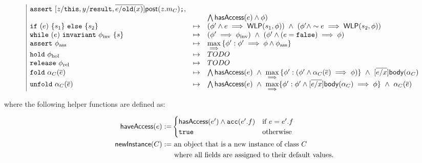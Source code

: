 \begin{spacing}{1.5}
\begin{align*}
\begin{array}{l}
\begin{array}{|lcl}
    \code{assert} \ [ z/\code{this}, y/\code{result}, \overline{e/\code{old}(x)} ] \tsf{post}(z.m_C) \code{;}, \\ &&
  \bigwedge \tsf{hasAccess}(e) \land \phi )
\\
\code{if} \ (e) \ \{ s_1 \} \ \code{else} \ \{ s_2 \} &\mapsto&
  (\phi\p \land e \implies \WLP(s_1, \phi)) \ \land \
  (\phi\p \land \pnot e \implies \WLP(s_2, \phi))
\\
\code{while} \ (e) \ \code{invariant} \ \phi_\text{inv} \ \{ s \} &\mapsto&
  (\phi\p \implies \phi_\text{inv}) \ \land \
  (\phi\p \land (e = \code{false}) \implies \phi)
\\
\code{assert} \ \phi_\text{ass} &\mapsto&
  \weakest\set{ \phi\p : \phi\p \implies \phi \land \phi_\text{ass} }
\\
\code{hold} \ \phi_\text{hol} &\mapsto&
  TODO
\\
\code{release} \ \phi_\text{rel} &\mapsto&
  TODO
\\
\code{fold} \ \alpha_C(\overline{e}) &\mapsto&
  \bigwedge \tsf{hasAccess}(e) \ \land \
  \weakest\set{ \phi\p : (\phi\p \land \alpha_C(\overline{e}) \implies \phi) }
  \ \land \
  [ \overline{e/x} ] \tsf{body}(\alpha_C)
\\
\code{unfold} \ \alpha_C(\overline{e}) &\mapsto&
  \bigwedge \tsf{hasAccess}(e) \ \land \
  \weakest\{ \phi\p : \phi\p \land  [ \overline{e/x} ] \tsf{body}(\alpha_C) \implies \phi \}
  \ \land \
  \alpha_C(\overline{e})
%
\end{array}
\end{array}
\end{align*}
\end{spacing}

\newpage
\noindent
where the following helper functions are defined as:

\begin{align*}
\textsf{haveAccess}(e) := & \begin{cases}
  \textsf{hasAccess}(e^\prime) \land \texttt{acc}(e^\prime.f) & \text{if} \ e = e^\prime.f \\
  \texttt{true} & \text{otherwise}
\end{cases}
\\
\textsf{newInstance}(C) :=
  & \ \text{an object that is a new instance of class $C$} \\
  & \ \text{where all fields are assigned to their default values.}
\\
\end{align*}
